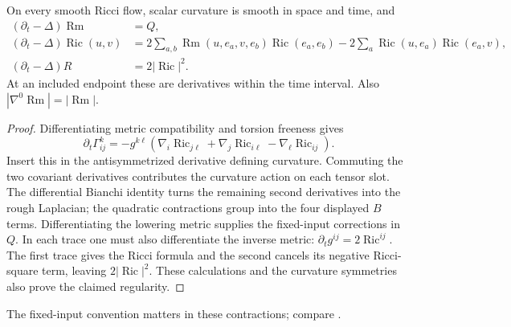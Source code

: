 \begin{proposition}\label{prop:rf-evolution}
On every smooth Ricci flow, scalar curvature is smooth in space and time,
and
\[
\begin{split}
 (\partial_t-\Delta)\operatorname{Rm}&=Q,\\
 (\partial_t-\Delta)\operatorname{Ric}(u,v)
 &=2\sum_{a,b}\operatorname{Rm}(u,e_a,v,e_b)\operatorname{Ric}(e_a,e_b)
       -2\sum_a\operatorname{Ric}(u,e_a)\operatorname{Ric}(e_a,v),\\
 (\partial_t-\Delta)R&=2|\operatorname{Ric}|^2.
\end{split}
\]
At an included endpoint these are derivatives within the time interval.
Also $|\nabla^0\operatorname{Rm}|=|\operatorname{Rm}|$.
\end{proposition}
\begin{proof}
Differentiating metric compatibility and torsion freeness gives
\[
 \partial_t\Gamma^k_{ij}
 =-g^{k\ell}(\nabla_i\operatorname{Ric}_{j\ell}
             +\nabla_j\operatorname{Ric}_{i\ell}
             -\nabla_\ell\operatorname{Ric}_{ij}).
\]
Insert this in the antisymmetrized derivative defining curvature.
Commuting the two covariant derivatives contributes the curvature
action on each tensor slot.  The differential Bianchi identity turns
the remaining second derivatives into the rough Laplacian; the
quadratic contractions group into the four displayed $B$ terms.
Differentiating the lowering metric supplies the fixed-input corrections
in $Q$.  In each trace one must also differentiate the inverse metric:
$\partial_tg^{ij}=2\operatorname{Ric}^{ij}$.  The first trace gives the
Ricci formula and the second cancels its negative Ricci-square term,
leaving $2|\operatorname{Ric}|^2$.  These calculations and the curvature
symmetries also prove the claimed regularity.
\end{proof}
The fixed-input convention matters in these contractions; compare
\cite[equations (3.5)--(3.6), p.~41; Lemma 3.15, p.~42]{MT2007}.

